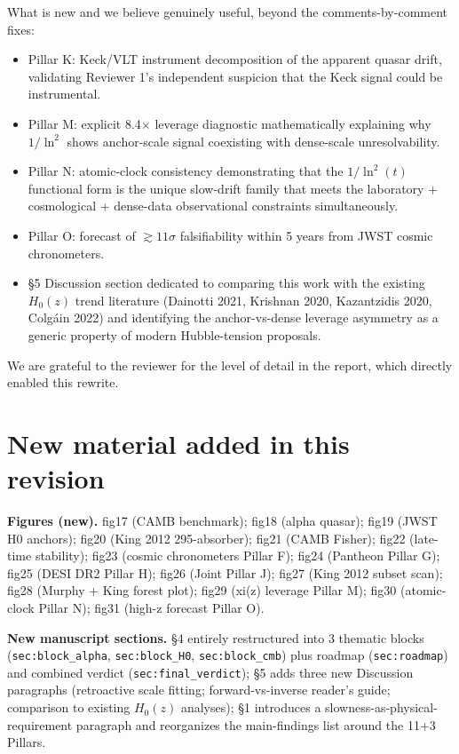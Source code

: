 \documentclass[12pt,a4paper]{article}
\begin{document}
What is new and we believe genuinely useful, beyond the comments-by-comment fixes:
\begin{itemize}[leftmargin=2em]
  \item Pillar K: Keck/VLT instrument decomposition of the apparent quasar drift, validating Reviewer 1's independent suspicion that the Keck signal could be instrumental.
  \item Pillar M: explicit 8.4$\times$ leverage diagnostic mathematically explaining why $1/\ln^2$ shows anchor-scale signal coexisting with dense-scale unresolvability.
  \item Pillar N: atomic-clock consistency demonstrating that the $1/\ln^2(t)$ functional form is the unique slow-drift family that meets the laboratory + cosmological + dense-data observational constraints simultaneously.
  \item Pillar O: forecast of $\gtrsim 11\sigma$ falsifiability within 5 years from JWST cosmic chronometers.
  \item §5 Discussion section dedicated to comparing this work with the existing $H_0(z)$ trend literature (Dainotti 2021, Krishnan 2020, Kazantzidis 2020, Colgáin 2022) and identifying the anchor-vs-dense leverage asymmetry as a generic property of modern Hubble-tension proposals.
\end{itemize}

We are grateful to the reviewer for the level of detail in the report, which directly enabled this rewrite.

\section*{New material added in this revision}

\textbf{Figures (new).}
fig17 (CAMB benchmark);
fig18 (alpha quasar);
fig19 (JWST H0 anchors);
fig20 (King 2012 295-absorber);
fig21 (CAMB Fisher);
fig22 (late-time stability);
fig23 (cosmic chronometers Pillar F);
fig24 (Pantheon Pillar G);
fig25 (DESI DR2 Pillar H);
fig26 (Joint Pillar J);
fig27 (King 2012 subset scan);
fig28 (Murphy + King forest plot);
fig29 (xi(z) leverage Pillar M);
fig30 (atomic-clock Pillar N);
fig31 (high-z forecast Pillar O).

\textbf{New manuscript sections.}
§4 entirely restructured into 3 thematic blocks (\texttt{sec:block\_alpha}, \texttt{sec:block\_H0}, \texttt{sec:block\_cmb}) plus roadmap (\texttt{sec:roadmap}) and combined verdict (\texttt{sec:final\_verdict});
§5 adds three new Discussion paragraphs (retroactive scale fitting; forward-vs-inverse reader's guide; comparison to existing $H_0(z)$ analyses);
§1 introduces a slowness-as-physical-requirement paragraph and reorganizes the main-findings list around the 11+3 Pillars.
\end{document}
